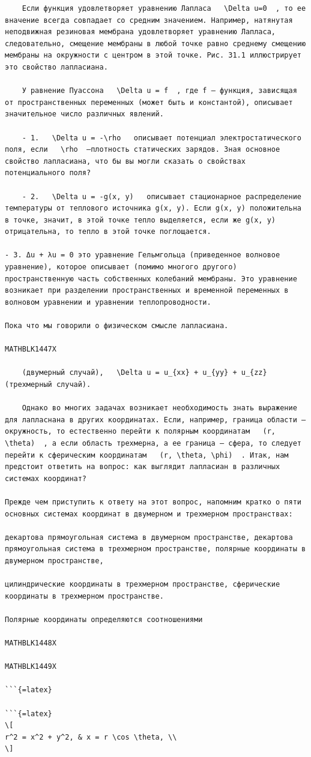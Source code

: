 \documentclass[
]{article}
\begin{document}
\begin{verbatim}
    Если функция удовлетворяет уравнению Лапласа   \Delta u=0  , то ее вначение всегда совпадает со средним значением. Например, натянутая неподвижная резиновая мембрана удовлетворяет уравнению Лапласа, следовательно, смещение мембраны в любой точке равно среднему смещению мембраны на окружности с центром в этой точке. Рис. 31.1 иллюстрирует это свойство лапласиана.

    У равнение Пуассона   \Delta u = f  , где f — функция, зависящая от пространственных переменных (может быть и константой), описывает значительное число различных явлений.

    - 1.   \Delta u = -\rho   описывает потенциал электростатического поля, если   \rho  —плотность статических зарядов. Зная основное свойство лапласиана, что бы вы могли сказать о свойствах потенциального поля?

    - 2.   \Delta u = -g(x, y)   описывает стационарное распределение температуры от теплового источника g(x, y). Если g(x, y) положительна в точке, значит, в этой точке тепло выделяется, если же g(x, y) отрицательна, то тепло в этой точке поглощается.

- 3. Δu + λu = 0 это уравнение Гельмгольца (приведенное волновое уравнение), которое описывает (помимо многого другого) пространственную часть собственных колебаний мембраны. Это уравнение возникает при разделении пространственных и временной переменных в волновом уравнении и уравнении теплопроводности.

Пока что мы говорили о физическом смысле лапласиана.

MATHBLK1447X

    (двумерный случай),   \Delta u = u_{xx} + u_{yy} + u_{zz}   (трехмерный случай).

    Однако во многих задачах возникает необходимость знать выражение для лапласнана в других координатах. Если, например, граница области — окружность, то естественно перейти к полярным координатам   (r, \theta)  , а если область трехмерна, а ее граница — сфера, то следует перейти к сферическим координатам   (r, \theta, \phi)  . Итак, нам предстоит ответить на вопрос: как выглядит лапласиан в различных системах координат?

Прежде чем приступить к ответу на этот вопрос, напомним кратко о пяти основных системах координат в двумерном и трехмерном пространствах:

декартова прямоугольная система в двумерном пространстве, декартова прямоугольная система в трехмерном пространстве, полярные координаты в двумерном пространстве,

цилиндрические координаты в трехмерном пространстве, сферические координаты в трехмерном пространстве.

Полярные координаты определяются соотношениями

MATHBLK1448X

MATHBLK1449X

```{=latex}

```{=latex}
\[
r^2 = x^2 + y^2, & x = r \cos \theta, \\
\]
\end{verbatim}
\end{document}
